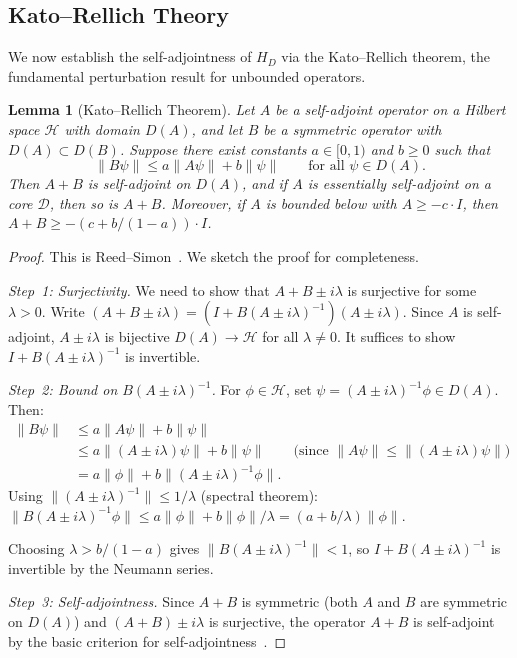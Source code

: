 \documentclass[11pt,a4paper]{article}
\theoremstyle{plain}
\newtheorem{lemma}[theorem]{Lemma}
\theoremstyle{remark}
\newcommand{\HH}{\mathcal{H}}
\newcommand{\norm}[1]{\lVert #1 \rVert}
\begin{document}
\subsection{Kato--Rellich Theory}

We now establish the self-adjointness of $H_D$ via the Kato--Rellich
theorem, the fundamental perturbation result for unbounded operators.

\begin{lemma}[Kato--Rellich Theorem]\label{lem:kato-rellich}
Let $A$ be a self-adjoint operator on a Hilbert space $\HH$ with domain
$D(A)$, and let $B$ be a symmetric operator with $D(A)\subset D(B)$.
Suppose there exist constants $a\in[0,1)$ and $b\geq 0$ such that
\begin{equation}\label{eq:kato-rellich-bound}
  \norm{B\psi}\leq a\norm{A\psi}+b\norm{\psi}
  \qquad\text{for all }\psi\in D(A).
\end{equation}
Then $A+B$ is self-adjoint on $D(A)$, and if $A$ is essentially
self-adjoint on a core $\mathcal{D}$, then so is $A+B$.
Moreover, if $A$ is bounded below with $A\geq -c\cdot I$, then
$A+B\geq -(c+b/(1-a))\cdot I$.
\end{lemma}

\begin{proof}
This is Reed--Simon~\cite[Thm.~X.12]{reed-simon1975}.  We sketch the
proof for completeness.

\emph{Step~1: Surjectivity.}  We need to show that $A+B\pm i\lambda$
is surjective for some $\lambda>0$.  Write
$(A+B\pm i\lambda)=(I+B(A\pm i\lambda)^{-1})(A\pm i\lambda)$.
Since $A$ is self-adjoint, $A\pm i\lambda$ is bijective $D(A)\to\HH$
for all $\lambda\neq 0$.  It suffices to show $I+B(A\pm i\lambda)^{-1}$
is invertible.

\emph{Step~2: Bound on $B(A\pm i\lambda)^{-1}$.}
For $\phi\in\HH$, set $\psi=(A\pm i\lambda)^{-1}\phi\in D(A)$. Then:
\begin{align*}
  \norm{B\psi} &\leq a\norm{A\psi}+b\norm{\psi}\\
  &\leq a\norm{(A\pm i\lambda)\psi}+b\norm{\psi}
  \qquad\text{(since $\norm{A\psi}\leq\norm{(A\pm i\lambda)\psi}$)}\\
  &= a\norm{\phi}+b\norm{(A\pm i\lambda)^{-1}\phi}.
\end{align*}
Using $\norm{(A\pm i\lambda)^{-1}}\leq 1/\lambda$ (spectral theorem):
$\norm{B(A\pm i\lambda)^{-1}\phi}\leq a\norm{\phi}+b\norm{\phi}/\lambda
=(a+b/\lambda)\norm{\phi}$.

Choosing $\lambda>b/(1-a)$ gives $\norm{B(A\pm i\lambda)^{-1}}<1$,
so $I+B(A\pm i\lambda)^{-1}$ is invertible by the Neumann series.

\emph{Step~3: Self-adjointness.}  Since $A+B$ is symmetric (both $A$ and
$B$ are symmetric on $D(A)$) and $(A+B)\pm i\lambda$ is surjective,
the operator $A+B$ is self-adjoint by the basic criterion for
self-adjointness~\cite[Thm.~X.1]{reed-simon1975}.
\end{proof}
\end{document}
